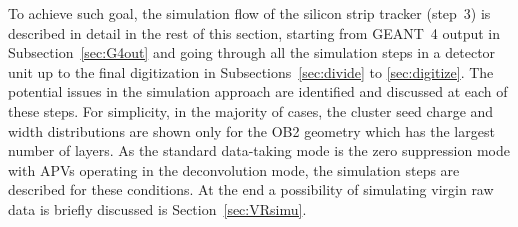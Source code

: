 To achieve such goal, the simulation flow of the silicon strip tracker (step~3) is described in detail in the rest of this section, starting from GEANT~4 output in Subsection~\ref{sec:G4out} and going through all the simulation steps in a detector unit up to the final digitization in Subsections~\ref{sec:divide} to \ref{sec:digitize}. The potential issues in the simulation approach are identified and discussed at each of these steps. For simplicity, in the majority of cases, the cluster seed charge and width distributions are shown only for the OB2 geometry which has the largest number of layers. As the standard data-taking mode is the zero suppression mode with APVs operating in the deconvolution mode, the simulation steps are described for these conditions. At the end a possibility of simulating virgin raw data is briefly discussed is Section~\ref{sec:VRsimu}.




